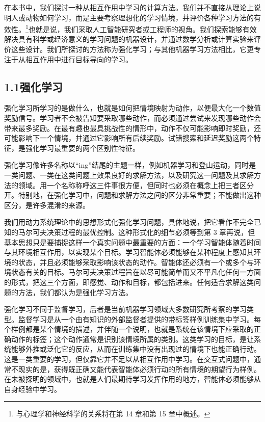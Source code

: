 \documentclass[UTF8,12pt,a4paper,fontset=fandol]{ctexart}
\begin{document}
在本书中，我们探讨一种从相互作用中学习的计算方法。我们并不直接从理论上说明人或动物如何学习，而是主要考察理想化的学习情境，并评价各种学习方法的有效性。\footnote{与心理学和神经科学的关系将在第 14 章和第 15 章中概述。}也就是说，我们采取人工智能研究者或工程师的视角。我们探索能够有效解决具有科学或经济意义的学习问题的机器设计，并通过数学分析或计算实验来评价这些设计。我们所探讨的方法称为强化学习；与其他机器学习方法相比，它更专注于从相互作用中进行目标导向的学习。

\subsection*{1.1\quad 强化学习}

强化学习所学习的是做什么，也就是如何把情境映射为动作，以便最大化一个数值奖励信号。学习者不会被告知要采取哪些动作，而必须通过尝试来发现哪些动作会带来最多奖励。在最有趣也最具挑战性的情形中，动作不仅可能影响即时奖励，还可能影响下一个情境，并通过它影响所有后续奖励。试错搜索和延迟奖励这两个特征，是强化学习最重要的两个区别性特征。

强化学习像许多名称以“ing”结尾的主题一样，例如机器学习和登山运动，同时是一类问题、一类在这类问题上效果良好的求解方法，以及研究这一问题及其求解方法的领域。用一个名称称呼这三件事很方便，但同时也必须在概念上把三者区分开。特别地，在强化学习中，问题和求解方法之间的区分非常重要；不能做出这种区分，是许多混淆的来源。

我们用动力系统理论中的思想形式化强化学习问题，具体地说，把它看作不完全已知的马尔可夫决策过程的最优控制。这种形式化的细节必须等到第 3 章再说，但基本思想只是要捕捉这样一个真实问题中最重要的方面：一个学习智能体随着时间与其环境相互作用，以实现某个目标。学习智能体必须能够在某种程度上感知其环境的状态，并且必须能够采取影响该状态的动作。智能体还必须有一个或多个与环境状态有关的目标。马尔可夫决策过程旨在以尽可能简单而又不平凡化任何一方面的形式，把这三个方面，即感觉、动作和目标，都包括进来。任何适合求解这类问题的方法，我们都认为是强化学习方法。

强化学习不同于监督学习，后者是当前机器学习领域大多数研究所考察的学习类型。监督学习是从一个由有知识的外部监督者提供的带标签样例训练集中学习。每个样例都是某个情境的描述，并伴随一个说明，也就是系统在该情境下应采取的正确动作的标签；这个动作通常是识别该情境所属的类别。这类学习的目标，是让系统能够外推或泛化它的反应，从而在训练集中没有出现过的情境下也能正确行动。这是一类重要的学习，但仅靠它并不足以从相互作用中学习。在交互式问题中，通常不现实的是，获得既正确又能代表智能体必须行动的所有情境的期望行为样例。在未被探明的领域中，也就是人们最期待学习发挥作用的地方，智能体必须能够从自身经验中学习。
\end{document}
